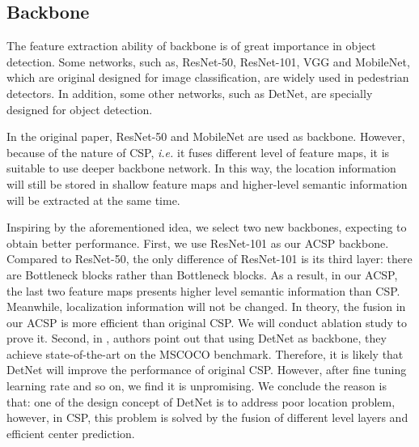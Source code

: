 \documentclass[twocolumn]{article}
\begin{document}
\subsection{Backbone}\label{BB}
The feature extraction ability of backbone is of great importance in object detection. Some networks, such as, ResNet-50\cite{luo2018differentiable}, ResNet-101\cite{luo2018differentiable},  VGG\cite{simonyan2014very} and MobileNet\cite{howard2017mobilenets}, which are original designed for image classification, are 
widely used in pedestrian detectors. In addition, some other networks, such as DetNet\cite{li2018detnet}, are specially designed for object detection.\par 
In the original paper\cite{liu2019high}, ResNet-50\cite{luo2018differentiable} and MobileNet\cite{howard2017mobilenets} are used as backbone. However, because of the nature of CSP\cite{liu2019high}, \textit{i.e.} it fuses different level of feature maps, it is suitable to use deeper backbone network. In this way, the location information will still be stored  in shallow feature maps and higher-level semantic information will be extracted at the same time.\par 
Inspiring by the aforementioned idea, we select two new backbones, expecting to obtain better performance. First, we use ResNet-101\cite{luo2018differentiable} as our ACSP backbone. Compared to ResNet-50\cite{luo2018differentiable}, the only difference of ResNet-101\cite{luo2018differentiable} is its third layer: there are  Bottleneck blocks rather than  Bottleneck blocks. As a result, in our ACSP, the last two feature maps presents higher level semantic information than CSP\cite{liu2019high}. Meanwhile, localization information will not be changed. In theory, the fusion in our ACSP is more efficient than original CSP\cite{liu2019high}. We will conduct ablation study to prove it. Second, in \cite{li2018detnet}, authors point out that using DetNet\cite{li2018detnet} as backbone, they achieve state-of-the-art on the MSCOCO benchmark\cite{lin2014microsoft}. Therefore, it is likely that DetNet\cite{li2018detnet} will improve the performance of original CSP\cite{liu2019high}. However, after fine tuning learning rate and so on, we find it is unpromising. We conclude the reason is that: one of the design concept of DetNet\cite{li2018detnet} is to address poor location problem, however, in CSP\cite{liu2019high}, this problem is solved by the fusion of different level layers and efficient center prediction.
\end{document}
